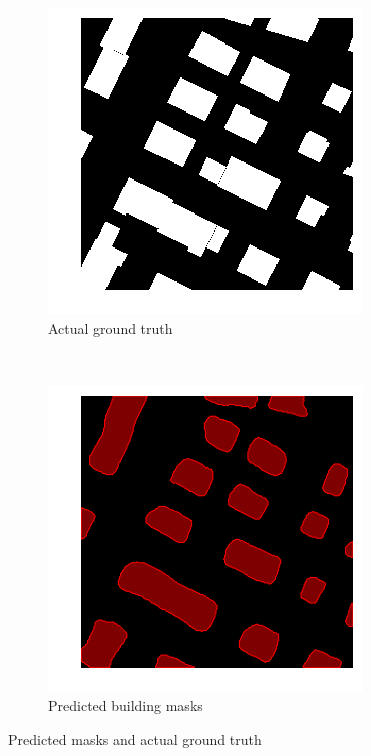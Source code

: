 \begin{figure}[H]
	\centering
	\begin{subfigure}{0.4\textwidth}
		\centering
    	\includegraphics[width=0.9\linewidth]{chapters/challenges/images/predicted_masks_gt.png}		    \caption{Actual ground truth}
    	\label{fig:challenges:predicted_building_masks_gt}
	\end{subfigure}~
		\begin{subfigure}{0.4\textwidth}
		\centering
    	\includegraphics[width=0.9\linewidth]{chapters/challenges/images/predicted_masks.png}		    \caption{Predicted building masks}
    	\label{fig:challenges:predicted_building_masks}
	\end{subfigure}
	\caption{Predicted masks and actual ground truth}
	\label{fig:challenges:building_masks}
\end{figure}

